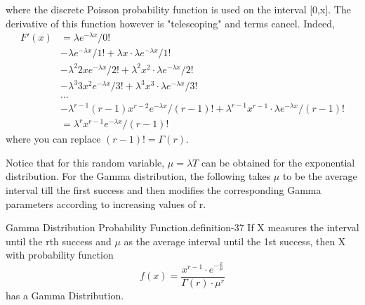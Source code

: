 \documentclass[10pt,]{book}
\numberwithin{equation}{section}
\begin{document}
where the discrete Poisson probability function is used on the interval [0,x]. The derivative of this function however is "telescoping" and terms cancel. Indeed,%
\begin{align*}
F'(x) & = \lambda e^{-\lambda x}/0!\\
& - \lambda e^{-\lambda x}/1! + \lambda x \cdot \lambda e^{-\lambda x}/1!\\
& - \lambda^2 2x e^{-\lambda x}/2! + \lambda^2 x^2 \cdot \lambda e^{-\lambda x}/2!\\
& - \lambda^3 3x^2 e^{-\lambda x}/3! + \lambda^3 x^3 \cdot \lambda e^{-\lambda x}/3!\\
& . . .\\
& - \lambda^{r-1} (r-1)x^{r-2} e^{-\lambda x}/(r-1)! + \lambda^{r-1} x^{r-1} \cdot \lambda e^{-\lambda x}/(r-1)!\\
& = \lambda^r x^{r-1} e^{-\lambda x}/(r-1)!
\end{align*}
where you can replace \((r-1)! = \Gamma(r)\).%
\par
\hypertarget{p-1134}{}%
Notice that for this random variable, \(\mu = \lambda T\) can be obtained for the exponential distribution. For the Gamma distribution, the following takes \(\mu\) to be the average interval till the first success and then modifies the corresponding Gamma parameters according to increasing values of r.%
\par
\hypertarget{p-1135}{}%
\begin{definition}{Gamma Distribution Probability Function.}{definition-37}%
\hypertarget{p-1136}{}%
If X measures the interval until the rth success and \(\mu\) as the average interval until the 1st success, then X with probability function%
\begin{equation*}
f(x) =  \frac{x^{r-1} \cdot e^{-\frac{x}{\mu}}}{\Gamma(r) \cdot \mu^r}
\end{equation*}
has a Gamma Distribution.%
\end{definition}
%
\par
\hypertarget{p-1137}{}%
\end{document}
